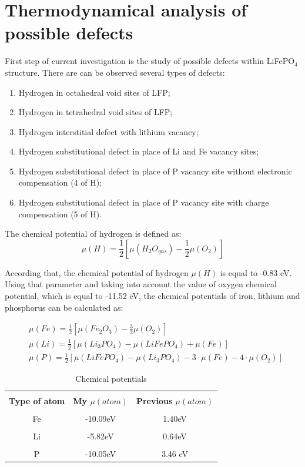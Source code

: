 \section{Thermodynamical analysis of possible defects}

First step of current investigation is the study of possible defects within LiFePO$_4$ structure. There are can be observed several types of defects:
\begin{enumerate} 
	\item Hydrogen in octahedral void sites of LFP;
	\item Hydrogen in tetrahedral void sites of LFP;
	\item Hydrogen interstitial defect with lithium vacancy;
	\item Hydrogen substitutional defect in place of Li and Fe vacancy sites;
	\item Hydrogen substitutional defect in place of P vacancy site without electronic compensation (4 of H);
	\item Hydrogen substitutional defect in place of P vacancy site with charge compensation (5 of H).
\end{enumerate}

The chemical potential of hydrogen is defined as:
\begin{equation}
    \mu(H)=\frac{1}{2}[\mu(H_2O_{gas})-\frac{1}{2}\mu(O_2)]
\end{equation}

According that, the chemical potential of hydrogen $\mu(H)$ is equal to -0.83 eV. Using that parameter and taking into account the value of oxygen chemical potential, which is equal to  -11.52 eV, the chemical potentials of iron, lithium and phosphorus can be calculated as:

\begin{eqnarray}
\label{FeLiP}
  &\mu(Fe)=\frac{1}{2}[\mu(Fe_2O_3)-\frac{3}{2}\mu(O_2)] \nonumber \\ 
  &\mu(Li)=\frac{1}{2}[\mu(Li_3PO_4)-\mu(LiFePO_4)+\mu(Fe)] \\
  &\mu(P)=\frac{1}{2}[\mu(LiFePO_4)-\mu(Li_3PO_4)-3\cdot\mu(Fe)-4\cdot\mu(O_2)] \nonumber
\end{eqnarray}

\begin{table}[h]
\caption{Chemical potentials}
\label{tabular:LiFeP}
\begin{center}
\begin{tabular}{|c|c|c|}
\hline
& &  \\
\textbf{Type of atom} & \textbf{My $\mu(atom)$} & \textbf{Previous $\mu(atom)$}  \\
\hline
& &  \\
Fe & -10.09eV & 1.40eV \\ 
\hline
& &  \\
Li &  -5.82eV  &  0.64eV \\ 
\hline
& &  \\
P &  -10.05eV & 3.46 eV \\ 
\hline
\end{tabular}
\end{center}
\end{table}

